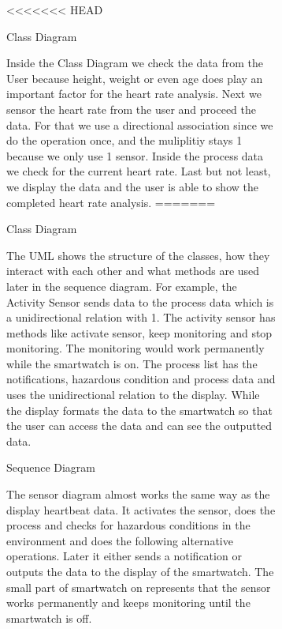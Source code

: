 \documentclass{article}
\begin{document}
	\begin{figure}[htbp]
		\centering
		\begin{subfigure}{\textwidth}
<<<<<<< HEAD
			\resizebox{\textwidth}{!}{}
			\caption{Class Diagram}
		\end{subfigure}
		\begin{subfigure}{\textwidth}
			Inside the Class Diagram we check the data from the User because height, weight or even age does play an important factor
			for the heart rate analysis. Next we sensor the heart rate from the user and proceed the data. For that we use a directional 
			association since we do the operation once, and the muliplitiy stays 1 because we only use 1 sensor. Inside the process data we check for 
			the current heart rate. Last but not least, we display the data and the user is able to show the completed heart rate 
			analysis. 
=======
			\resizebox{\textwidth}{!}{}
			\caption{Class Diagram}
		\end{subfigure}
		\begin{subfigure}{\textwidth}
			The UML shows the structure of the classes, how they interact with each other and what methods are 
			used later in the sequence diagram. For example, the Activity Sensor sends data to the process data 
			which is a unidirectional relation with 1. The activity sensor has methods like activate sensor, keep 
			monitoring and stop monitoring. The monitoring would work permanently while the smartwatch is on. The 
			process list has the notifications, hazardous condition and process data and uses the unidirectional 
			relation to the display. While the display formats the data to the smartwatch so that the user can access 
			the data and can see the outputted data. 
		\end{subfigure}
	\end{figure}
	

	\begin{figure}[htbp]
		\centering
		\begin{subfigure}{\textwidth}
			\resizebox{\textwidth}{!}{}
			\caption{Sequence Diagram}
		\end{subfigure}
		\begin{subfigure}{\textwidth}
			The sensor diagram almost works the same way as the display heartbeat data. It activates the sensor, 
			does the process and checks for hazardous conditions in the environment and does the following alternative
			operations. Later it either sends a notification or outputs the data to the display of the smartwatch. 
			The small part of smartwatch on represents that the sensor works permanently and keeps monitoring until 
			the smartwatch is off. 
		\end{subfigure}
	\end{figure}
	\newpage
\end{document}
